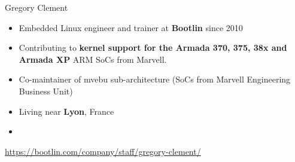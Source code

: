\begin{frame}{Gregory Clement}
    \begin{itemize}
        \item Embedded Linux engineer and trainer at {\bf Bootlin}
              since 2010
        \item Contributing to {\bf kernel support for the Armada 370, 375, 38x and
              Armada XP} ARM SoCs from Marvell.
        \item Co-maintainer of mvebu sub-architecture (SoCs from Marvell
                  Engineering Business Unit)
        \item Living near {\bf Lyon}, France
        \item {}
    \end{itemize}
    {\small \url{https://bootlin.com/company/staff/gregory-clement/}}
\end{frame}
